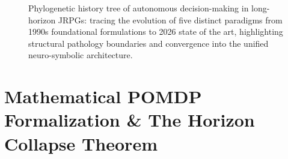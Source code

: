 \documentclass[journal,10pt,twocolumn]{IEEEtran}
\begin{document}
\begin{figure}[t]
{%
}
\caption{Phylogenetic history tree of autonomous decision-making in long-horizon JRPGs: tracing the evolution of five distinct paradigms from 1990s foundational formulations to 2026 state of the art, highlighting structural pathology boundaries and convergence into the unified neuro-symbolic architecture.}
\label{fig:evolution_roadmap}
\end{figure}

\section{Mathematical POMDP Formalization \& The Horizon Collapse Theorem}
\end{document}
